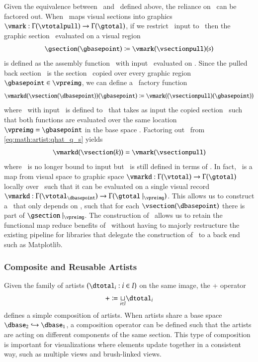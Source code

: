 \documentclass[journal]{vgtc}                %
\begin{document}
Given the equivalence between \vsection\ and \vsectionpull\ defined above, the reliance on \gbase\ can be factored out. When \vmark\ maps visual sections into graphics $\vmark: \Gamma(\vtotalpull) \rightarrow \Gamma(\gtotal)$, if we restrict \vmark\ input to \vsectionpull\ then the graphic section \gsection\ evaluated on a visual region \gbasepoint\
\begin{equation}
    \gsection(\gbasepoint) \coloneqq \vmark(\vsectionpull)(s)
    \label{eq:math:artist:qhat}
\end{equation}
 is defined as the assembly function \vmark\ with input \vsectionpull\ evaluated on \gbasepoint. Since the pulled back section \vsectionpull\ is the section \vsection\ copied over every graphic region $\gbasepoint \in \vpreimg$, we can define a \vmark\ factory function 
\begin{equation}
\label{eq:math:artist:qhat_q_s}
\vmarkd(\vsection(\dbasepoint))(\gbasepoint) \coloneqq \vmark((\vsectionpull)(\gbasepoint))
\end{equation} 
where \vmarkd\ with input \vsection\ is defined to \vmark\ that takes as input the copied section \vsectionpull\ such that both functions are evaluated over the same location $\vpreimg = \gbasepoint$ in the base space \gbase. Factoring out \gbasepoint\ from \autoref{eq:math:artist:qhat_q_s} yields
\begin{equation}
\vmarkd(\vsection(k)) = \vmark(\vsectionpull)
\label{eq:math:artist:qhat_k}
\end{equation}
where \vmark\ is no longer bound to input but \vmarkd\ is still defined in terms of \dbase. In fact, \vmarkd\ is a map from visual space to graphic space $\vmarkd:\Gamma(\vtotal) \rightarrow \Gamma(\gtotal)$ locally over \dbasepoint\ such that it can be evaluated on a single visual record  $\vmarkd:\Gamma(\vtotal_{\dbasepoint}) \rightarrow \Gamma(\gtotal\mid_{\vpreimg})$. This allows us to construct a \vmarkd\ that only depends on \dbase, such that for each $\vsection(\dbasepoint)$ there is part of $\gsection\mid_{\vpreimg}$. The construction of \vmarkd\ allows us to retain the functional map reduce benefits of \vmark\ without having to majorly restructure the existing pipeline for libraries that delegate the construction of \gsection\ to a back end such as Matplotlib.

\subsubsection{Composite and Reusable Artists}
Given the family of artists $(\dtotal_i: i\in I)$ on the same image, the + operator 
\begin{equation}
+ \coloneqq \underset{i\in I}{\sqcup} \dtotal_{i}
\end{equation}
defines a simple composition of artists. When artists share a base space $\dbase_2 \hookrightarrow \dbase_1$, a composition operator can be defined such that the artists are acting on different components of the same section. This type of composition is important for visualizations where elements update together in a consistent way, such as multiple views \cite{alboRadarComparativeEvaluation2016a, hullmanKeeping2018} and brush-linked views\cite{beckerBrushingScatterplots1987,bujaInteractiveData1991}. 
\end{document}
